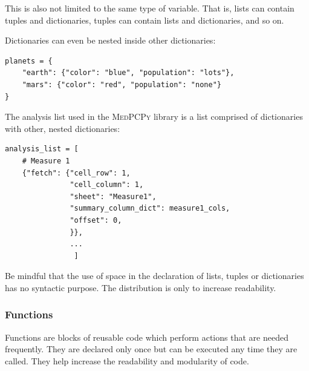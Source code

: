 \documentclass[a4paper,12pt]{article}
\begin{document}
This is also not limited to the same type of variable. That is, lists can contain tuples and dictionaries, tuples can contain lists and dictionaries, and so on.

Dictionaries can even be nested inside other dictionaries:

\begin{tcolorbox}[
    enhanced,
    attach boxed title to top left={xshift=6mm,yshift=-3mm},
    colback=lightgreen!20,
    colframe=lightgreen,
    colbacktitle=lightgreen,
    title=Python,
    fonttitle=\bfseries\color{black},
    boxed title style={size=small,colframe=lightgreen,sharp corners},
    sharp corners,
    ]
    \begin{verbatim}
planets = {
    "earth": {"color": "blue", "population": "lots"},
    "mars": {"color": "red", "population": "none"}
}
    \end{verbatim}
\end{tcolorbox}

The analysis list used in the {\scshape MedPCPy} library is a list comprised of dictionaries with other, nested dictionaries:

\begin{tcolorbox}[
    enhanced,
    attach boxed title to top left={xshift=6mm,yshift=-3mm},
    colback=lightgreen!20,
    colframe=lightgreen,
    colbacktitle=lightgreen,
    title=Python,
    fonttitle=\bfseries\color{black},
    boxed title style={size=small,colframe=lightgreen,sharp corners},
    sharp corners,
    ]
    \begin{verbatim}
analysis_list = [
    # Measure 1
    {"fetch": {"cell_row": 1,
               "cell_column": 1,
               "sheet": "Measure1",
               "summary_column_dict": measure1_cols,
               "offset": 0,
               }},
               ...
                ]
    \end{verbatim}
\end{tcolorbox}

Be mindful that the use of space in the declaration of lists, tuples or dictionaries has no syntactic purpose. The distribution is only to increase readability.

\subsubsection{Functions}

Functions are blocks of reusable code which perform actions that are needed frequently. They are declared only once but can be executed any time they are called. They help increase the readability and modularity of code.
\end{document}
